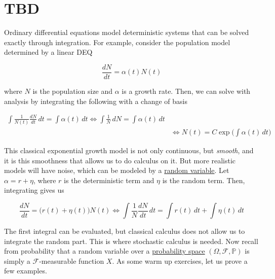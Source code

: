 \section{TBD}

	Ordinary differential equations model deterministic systems that can be solved exactly through integration. For example, consider the population model determined by a linear DEQ 

    \begin{equation}
      \frac{d N} {dt} = \alpha(t) N (t)
    \end{equation}

  where $N$ is the population size and $\alpha$ is a growth rate. Then, we can solve with analysis by integrating the following with a change of basis

  \begin{align*}
    \int \frac{1}{N(t)} \frac{dN}{dt} \,dt = \int \alpha(t) \,dt \iff \int \frac{1}{N} \, dN = \int \alpha(t) \,dt \\
    & \iff N(t) = C \exp \bigg( \int \alpha (t) \,dt \bigg) 
  \end{align*}
  
  This classical exponential growth model is not only continuous, but \textit{smooth}, and it is this smoothness that allows us to do calculus on it. But more realistic models will have noise, which can be modeled by a \hyperref[prob-def:random-variable]{random variable}. Let $\alpha = r + \eta$, where $r$ is the deterministic term and $\eta$ is the random term. Then, integrating gives us 

    \begin{equation}
      \frac{dN}{dt} = \big( r(t) + \eta(t) \big) N(t) \iff \int \frac{1}{N} \frac{dN}{dt} \,dt = \int r(t) \,dt + \int \eta(t) \,dt
    \end{equation}
    
  The first integral can be evaluated, but classical calculus does not allow us to integrate the random part. This is where stochastic calculus is needed. Now recall from probability that a random variable over a \hyperref[prob-def:probability-space]{probability space} $(\Omega, \mathcal{F}, \mathbb{P})$ is simply a $\mathcal{F}$-measurable function $X$. As some warm up exercises, let us prove a few examples. 

  \begin{example}[Class 1]
    \label{ex:class-1}
 
    
  \end{example}

